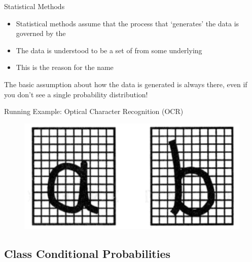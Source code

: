 \begin{frame}{Statistical Methods}{}
	\begin{itemize}
		\item Statistical methods assume that the process that `generates' the data is governed by the
		\item The data is understood to be a set of  from some
			underlying 
		\item This is the reason for the name 
	\end{itemize}
	
	\vspace*{2mm}
	\begin{boxBlueNoFrame}
		The basic assumption about how the data is generated is always there, even if you don't see
		a single probability distribution!
	\end{boxBlueNoFrame}
\end{frame}


\begin{frame}{Running Example: Optical Character Recognition (OCR)}{}
	\begin{figure}
		\centering
		\includegraphics[scale=0.6]{03_decision_theory/02_img/characters}
	\end{figure}
	\vspace*{-1mm}
	\footnotesize
\end{frame}


\subsection{Class Conditional Probabilities}

